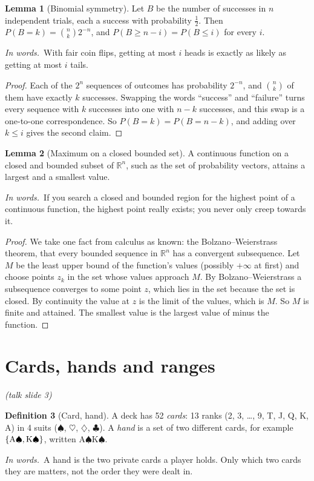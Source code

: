 \documentclass[11pt]{article}
\newcommand{\SP}{\ensuremath{\spadesuit}}\newcommand{\HE}{\ensuremath{\heartsuit}}
\newcommand{\DI}{\ensuremath{\diamondsuit}}\newcommand{\CL}{\ensuremath{\clubsuit}}
\newcommand{\R}{\mathbb R}\newcommand{\expl}{\mathrm{expl}}
\theoremstyle{definition}
\newtheorem{definition}{Definition}[section]
\newtheorem{lemma}[definition]{Lemma}
\newcommand{\inwords}{\par\smallskip\noindent\textit{In words.}\ }
\newcommand{\slide}[1]{\hfill{\small\itshape (talk slide #1)}}
\begin{document}
\begin{lemma}[Binomial symmetry]\label{lem:binsym}
Let $B$ be the number of successes in $n$ independent trials, each a success with probability $\frac12$. Then
$P(B=k)=\binom nk2^{-n}$, and $P(B\ge n-i)=P(B\le i)$ for every $i$.
\inwords With fair coin flips, getting at most $i$ heads is exactly as likely as getting at most $i$ tails.
\end{lemma}
\begin{proof}
Each of the $2^n$ sequences of outcomes has probability $2^{-n}$, and $\binom nk$ of them have exactly $k$ successes.
Swapping the words ``success'' and ``failure'' turns every sequence with $k$ successes into one with $n-k$ successes,
and this swap is a one-to-one correspondence. So $P(B=k)=P(B=n-k)$, and adding over $k\le i$ gives the second claim.
\end{proof}

\begin{lemma}[Maximum on a closed bounded set]\label{lem:evt}
A continuous function on a closed and bounded subset of $\R^n$, such as the set of probability vectors, attains a
largest and a smallest value.
\inwords If you search a closed and bounded region for the highest point of a continuous function, the highest point
really exists; you never only creep towards it.
\end{lemma}
\begin{proof}
We take one fact from calculus as known: the Bolzano--Weierstrass theorem, that every bounded sequence in $\R^n$ has
a convergent subsequence. Let $M$ be the least upper bound of the function's values (possibly $+\infty$ at first) and
choose points $z_k$ in the set whose values approach $M$. By Bolzano--Weierstrass a subsequence converges to some
point $z$, which lies in the set because the set is closed. By continuity the value at $z$ is the limit of the values,
which is $M$. So $M$ is finite and attained. The smallest value is the largest value of minus the function.
\end{proof}

\section{Cards, hands and ranges}\label{sec:cards}\slide{3}
\begin{definition}[Card, hand]\label{def:hand}
A deck has 52 \emph{cards}: 13 ranks (2, 3, \dots, 9, T, J, Q, K, A) in 4 suits (\SP, \HE, \DI, \CL). A \emph{hand}
is a set of two different cards, for example $\{\text{A\SP},\text{K\SP}\}$, written A\SP K\SP.
\inwords A hand is the two private cards a player holds. Only which two cards they are matters, not the order they
were dealt in.
\end{definition}
\end{document}
